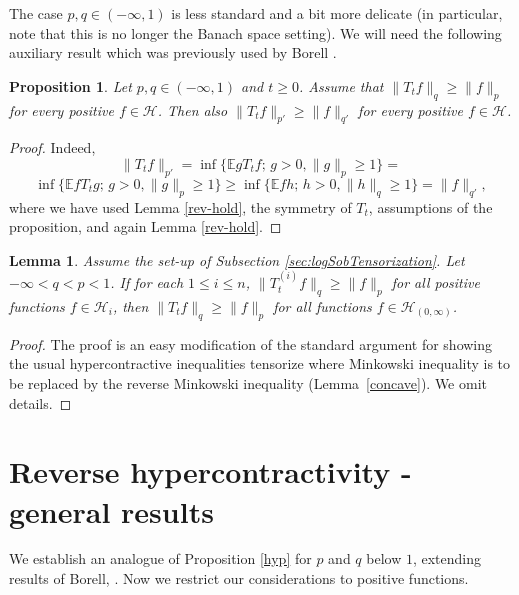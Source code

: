 \documentclass[11pt]{amsart}
\newcommand{\E}{\mathbb{E}}
\newcommand{\1}{\mathbf{1}}
\def\E{{\mathbb E}}
\def\H{{\mathcal{H}}}
\theoremstyle{definition}
\theoremstyle{plain}
\newtheorem{lemma}[example]{Lemma}
\newtheorem{proposition}[example]{Proposition}
\theoremstyle{remark}
\numberwithin{equation}{section}
\begin{document}
The case $p,q \in (-\infty,1)$ is less standard and a bit more delicate
(in particular, note that this is no longer the Banach space setting).
We will need the following auxiliary result which was previously used by Borell \cite{Borell82}.

\begin{proposition} \label{dual}
Let $p,q \in (-\infty,1)$ and $t \geq 0$. Assume that
$\| T_{t}f\|_{q} \geq \| f\|_{p}$ for every positive
$f \in \H$. Then also $\| T_{t}f\|_{p'} \geq \| f\|_{q'}$
for every positive $f \in \H$.
\end{proposition}

\begin{proof}
Indeed,
\[
\| T_{t}f\|_{p'}=
\inf\{ \E gT_{t}f;\, g>0, \| g\|_{p} \geq 1 \}=
\]
\[
\inf\{ \E fT_{t}g;\, g>0, \| g\|_{p} \geq 1 \} \geq
\inf\{ \E fh;\, h>0, \| h\|_{q} \geq 1\}=\| f\|_{q'},
\]
where we have used Lemma \ref{rev-hold}, the symmetry of
$T_{t}$, assumptions of the proposition, and again Lemma
\ref{rev-hold}.
\end{proof}

\begin{lemma}\label{lem:revhyptensorize}
Assume the set-up of Subsection \ref{sec:logSobTensorization}. Let $-\infty < q< p< 1$. If for each $1 \le i \le n$, $\|T_t^{(i)}f\|_q \ge \| f\|_p$ for all positive functions $f \in \mathcal H_i$, then $\| T_t f \|_q \ge \|f\|_p$ for all  functions $f \in \mathcal H_{(0, \infty)}$.
\end{lemma}
\begin{proof}
The proof is an easy modification of  the standard argument  for showing the usual hypercontractive inequalities tensorize where  Minkowski  inequality is to be replaced by  the reverse Minkowski inequality (Lemma~\ref{concave}). We omit details.
\end{proof}

\section{Reverse hypercontractivity - general results}

We establish an analogue of Proposition \ref{hyp} for $p$ and $q$ below $1$, extending results of Borell, \cite{Borell82}. Now we restrict our considerations to positive functions.
\end{document}
